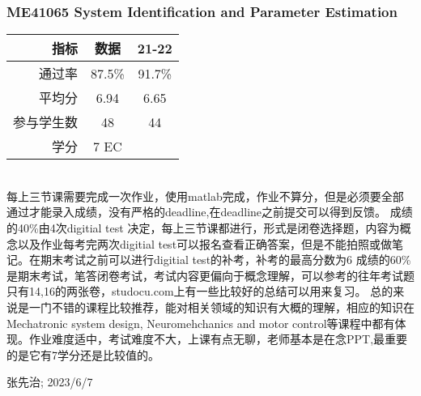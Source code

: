 \subsubsection{ME41065 System Identification and Parameter Estimation}
\begin{minipage}{0.45\textwidth}
\centering
{}
\end{minipage}%
\begin{minipage}{0.45\textwidth}
\raggedleft
\begin{tabular}{r|c|c}
\textbf{指标} & \textbf{数据} & \textbf{21-22}\\ \hline
通过率 & 87.5\% & 91.7\% \\ 
平均分 & 6.94 & 6.65\\ 
参与学生数 & 48 &44\\
学分 & 7 EC&\\
\end{tabular}
\end{minipage}\\

每上三节课需要完成一次作业，使用matlab完成，作业不算分，但是必须要全部通过才能录入成绩，没有严格的deadline,在deadline之前提交可以得到反馈。
成绩的40\%由4次digitial test 决定，每上三节课都进行，形式是闭卷选择题，内容为概念以及作业每考完两次digitial test可以报名查看正确答案，但是不能拍照或做笔记。在期末考试之前可以进行digitial test的补考，补考的最高分数为6
成绩的60\%是期末考试，笔答闭卷考试，考试内容更偏向于概念理解，可以参考的往年考试题只有14,16的两张卷，studocu.com上有一些比较好的总结可以用来复习。
总的来说是一门不错的课程比较推荐，能对相关领域的知识有大概的理解，相应的知识在Mechatronic system design, Neuromehchanics and motor control等课程中都有体现。作业难度适中，考试难度不大，上课有点无聊，老师基本是在念PPT,最重要的是它有7学分还是比较值的。
\begin{flushright}
张先治; 2023/6/7
\end{flushright}

